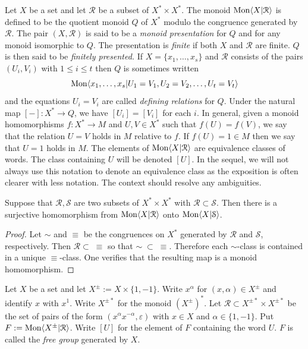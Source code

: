 \begin{defns} Let $X$ be a set and let $\mathcal{R}$ be a subset of $X^*\times
    X^*.$ The monoid $\mathrm{Mon}\langle X|\mathcal{R}\rangle$ is defined to be the quotient monoid
    $Q$ of $X^*$ modulo the congruence generated by $\mathcal{R}$. The pair
    $(X,\mathcal{R})$ is said to be a \emph{monoid presentation} for $Q$ and
    for any monoid isomorphic to $Q$. The presentation is \emph{finite} if both
    $X$ and $\mathcal{R}$ are finite. $Q$ is then said to be \emph{finitely
    presented.} If $X= \{x_1,\dots,x_s\}$ and $\mathcal{R}$ consists of the
    pairs $(U_i,V_i)$ with $1\le i \le t$ then $Q$ is sometimes written
    \[\mathrm{Mon}\langle x_1,\dots,x_s | U_1 = V_1, U_2 = V_2, \dots, U_t = V_t\rangle\] and the
    equations $U_i = V_i$ are called \emph{defining relations} for $Q$.  Under
    the natural map $[-] : X^* \rightarrow Q$, we have $[U_i] = [V_i]$ for each
    $i$. In general, given a monoid homomorphisms $f: X^* \rightarrow M$ and
    $U,V\in X^*$ such that $f(U) = f(V)$, we say that the relation $U=V$ holds
    in $M$ relative to $f$. If $f(U) = 1\in M$ then we say that $U=1$ holds in
    $M$. The elements of \(\mathrm{Mon}\langle X|\mathcal{R}\rangle\) are equivalence classes of
    words. The class containing $U$ will be denoted \([U]\). In the sequel, we
    will not always use this notation to denote an equivalence class as the
    exposition is often clearer with less notation. The context should resolve
    any ambiguities.
\end{defns}

\begin{prop} Suppose that $\mathcal{R},\mathcal{S}$ are two subsets of
    $X^*\times X^*$ with $\mathcal{R} \subset \mathcal{S}$. Then there is a
    surjective homomorphism from $\mathrm{Mon}\langle X|\mathcal{R}\rangle$ onto
    $\mathrm{Mon}\langle X|\mathcal{S}\rangle$.
\end{prop}
\begin{proof} Let $\sim$ and $\equiv$ be the congruences on $X^*$ generated by
    $\mathcal{R}$ and $\mathcal{S}$, respectively. Then $\mathcal{R} \subset\;
    \equiv$ so that $\sim \; \subset \;\equiv$. Therefore each $\sim$-class is
    contained in a unique $\equiv$-class. One verifies that the resulting map
    is a monoid homomorphism.
\end{proof}

\begin{defn} Let $X$ be a set and let $X^{\pm} := X\times \{1,-1\}$. Write
    $x^\alpha$ for $(x,\alpha) \in X^{\pm}$ and identify $x$ with $x^1$. Write
    $X^{\pm *}$ for the monoid $(X^\pm)^*$. Let $\mathcal{R} \subset X^{\pm *}
    \times X^{\pm *}$ be the set of pairs of the form $(x^\alpha x^{-\alpha},
    \varepsilon)$ with $x\in X$ and $\alpha\in \{1,-1\}$. Put $F := \mathrm{Mon}\langle X^\pm
    | \mathcal{R}\rangle$. Write $[U]$ for the element of $F$ containing the word
    $U$. $F$ is called the \emph{free group} generated by $X$.
\end{defn}

